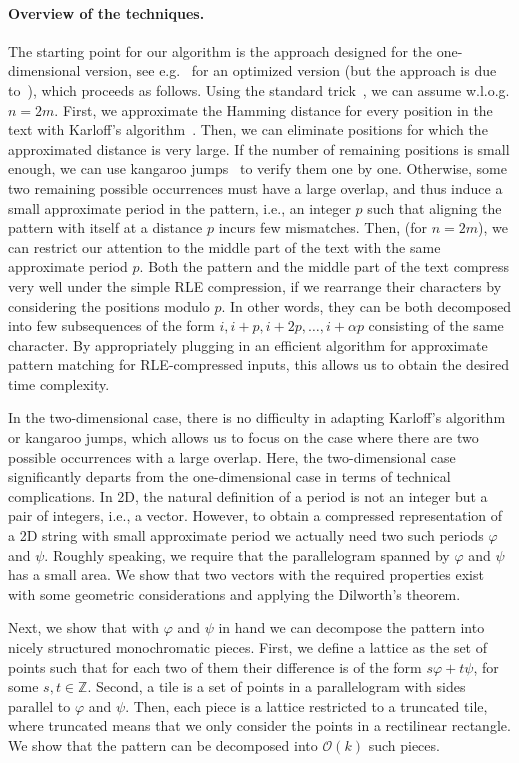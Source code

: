 \documentclass[twoside,leqno]{article}
\newcommand{\Z}{\mathbb{Z}}
\renewcommand{\O}{\mathcal{O}}
\renewcommand{\phi}{\varphi}
\begin{document}
\paragraph{Overview of the techniques.}
The starting point for our algorithm is the approach designed for the one-dimensional version, see e.g.~\cite{Gawrychowski2018}
for an optimized version (but the approach is due to~\cite{Clifford2016}), which proceeds as follows. Using the standard trick~\cite{Abrahamson1987}, we can assume w.l.o.g. $n = 2m$. 
First, we approximate the Hamming distance for every position in the text with Karloff's algorithm~\cite{Karloff1993}.
Then, we can eliminate positions for which the approximated distance is very large.
If the number of remaining positions is small enough, we can use kangaroo jumps~\cite{Galil1986} to verify them one by one.
Otherwise, some two remaining possible occurrences must have a large overlap, and thus induce a small approximate period in the pattern, i.e., an integer $p$ such that aligning the pattern with itself at a distance $p$ incurs few mismatches.
Then, (for $n=2m$), we can restrict our attention to the middle part of the text with the same approximate period $p$.
Both the pattern and the middle part of the text compress very well under the simple RLE compression, if we rearrange their characters
by considering the positions modulo $p$. In other words, they can be both decomposed into few subsequences
of the form $i, i+p, i+2p, \ldots, i+\alpha p$ consisting of the same character.
By appropriately plugging in an efficient algorithm for approximate pattern
matching for RLE-compressed inputs, this allows us to obtain the desired time complexity.

In the two-dimensional case, there is no difficulty in adapting Karloff's algorithm or kangaroo jumps, which allows
us to focus on the case where there are two possible occurrences with a large overlap. Here, the two-dimensional
case significantly departs from the one-dimensional case in terms of technical complications. In 2D,
the natural definition of a period is not an integer but a pair of integers, i.e., a vector.
However, to obtain a compressed representation of
a 2D string with small approximate period we actually need two such periods $\phi$ and $\psi$.
Roughly speaking, we require that the parallelogram spanned by $\phi$ and $\psi$ has a small area.
We show that two vectors with the required properties exist with some geometric considerations and
applying the Dilworth's theorem.

Next, we show that with $\phi$ and $\psi$ in hand we can decompose the pattern
into nicely structured monochromatic pieces. First, we define a lattice as the set of points such that for each two of them their difference is
of the form $s\phi+t\psi$, for some $s,t\in \Z$. Second, a tile is a set of points in a parallelogram with sides
parallel to $\phi$ and $\psi$. Then, each piece is a lattice restricted to a truncated tile, where truncated
means that we only consider the points in a rectilinear rectangle. We show that the pattern
can be decomposed into $\O(k)$ such pieces.
\end{document}

